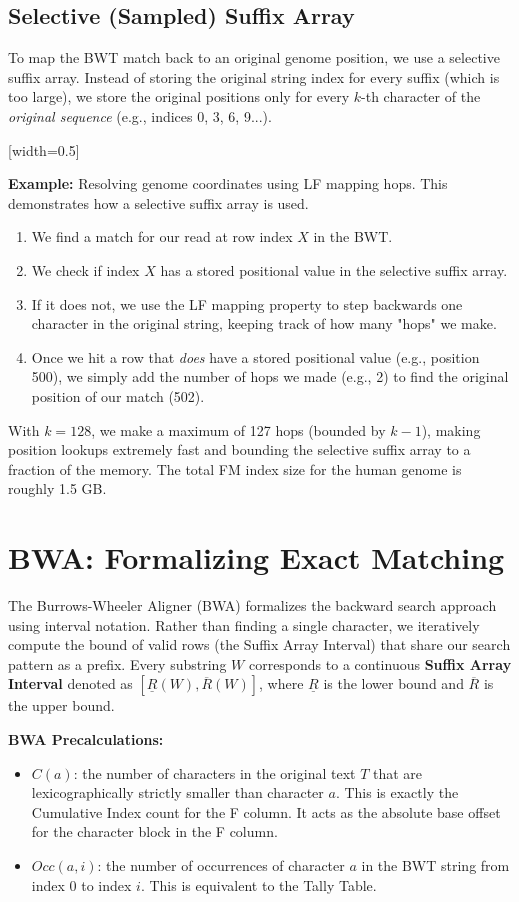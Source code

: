 \subsection{Selective (Sampled) Suffix Array}
To map the BWT match back to an original genome position, we use a selective suffix array. Instead of storing the original string index for every suffix (which is too large), we store the original positions only for every $k$-th character of the \textit{original sequence} (e.g., indices 0, 3, 6, 9...).

[width=0.5\textwidth]

\textbf{Example:} Resolving genome coordinates using LF mapping hops.
This demonstrates how a selective suffix array is used.
\begin{enumerate}
    \item We find a match for our read at row index $X$ in the BWT.
    \item We check if index $X$ has a stored positional value in the selective suffix array.
    \item If it does not, we use the LF mapping property to step backwards one character in the original string, keeping track of how many "hops" we make.
    \item Once we hit a row that \textit{does} have a stored positional value (e.g., position 500), we simply add the number of hops we made (e.g., 2) to find the original position of our match (502).
\end{enumerate}
With $k=128$, we make a maximum of 127 hops (bounded by $k-1$), making position lookups extremely fast and bounding the selective suffix array to a fraction of the memory. The total FM index size for the human genome is roughly 1.5 GB.

\section{BWA: Formalizing Exact Matching}

The Burrows-Wheeler Aligner (BWA) formalizes the backward search approach using interval notation. Rather than finding a single character, we iteratively compute the bound of valid rows (the Suffix Array Interval) that share our search pattern as a prefix. Every substring $W$ corresponds to a continuous \textbf{Suffix Array Interval} denoted as $[\underline{R}(W), \overline{R}(W)]$, where $\underline{R}$ is the lower bound and $\overline{R}$ is the upper bound.

\begin{important}
    \textbf{BWA Precalculations:}
    \begin{itemize}
        \item $C(a)$: the number of characters in the original text $T$ that are lexicographically strictly smaller than character $a$. This is exactly the Cumulative Index count for the F column. It acts as the absolute base offset for the character block in the F column.
        \item $Occ(a, i)$: the number of occurrences of character $a$ in the BWT string from index $0$ to index $i$. This is equivalent to the Tally Table.
    \end{itemize}
\end{important}

